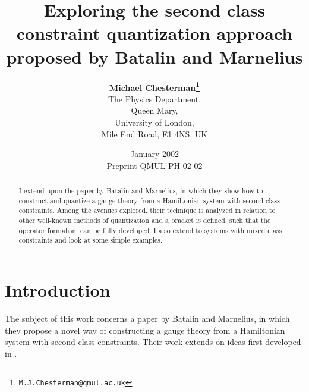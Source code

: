\documentclass[a4paper,12pt]{article}
\theoremstyle{definition}
\theoremstyle{remark}
\numberwithin{equation}{section}
\begin{document}
\title{Exploring the second class constraint quantization approach
proposed by Batalin and Marnelius}

\author{{\bf Michael Chesterman\footnote{\texttt{M.J.Chesterman@qmul.ac.uk}}}\\ {\small The Physics
Department,}\\{\small Queen Mary,}\\ \small{University of London,}
\\ {\small Mile End Road, E1 4NS, UK}}


\date{January 2002\\{\small Preprint QMUL-PH-02-02}}

\maketitle



\begin{abstract}
I extend upon the paper by Batalin and Marnelius, in which they
show how to construct and quantize a gauge theory from a
Hamiltonian system with second class constraints. Among
the avenues explored, their technique is analyzed in relation to
other well-known methods of quantization and a bracket is defined,
such that the operator formalism can be fully developed. I also
extend to systems with mixed class constraints and look at some
simple examples.
\end{abstract}

\section{Introduction}

The subject of this work concerns a paper \cite{Batalin:2001hs} by
Batalin and Marnelius, in which they propose a novel way of
constructing a gauge theory from a Hamiltonian system with second
class constraints. Their work extends on ideas first developed in
\cite{Lyakhovich:2001cm}.
\end{document}
